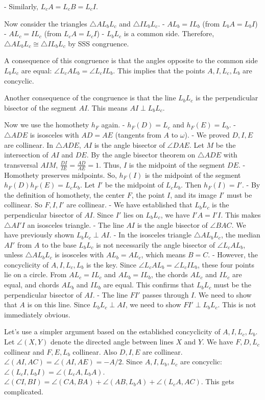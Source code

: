 - Similarly, $L_cA = L_cB = L_cI$.

Now consider the triangles $\triangle AL_bL_c$ and $\triangle IL_bL_c$.
- $AL_b = IL_b$ (from $L_bA=L_bI$)
- $AL_c = IL_c$ (from $L_cA=L_cI$)
- $L_bL_c$ is a common side.
Therefore, $\triangle AL_bL_c \cong \triangle IL_bL_c$ by SSS congruence.

A consequence of this congruence is that the angles opposite to the common side $L_bL_c$ are equal: $\angle L_cAL_b = \angle L_cIL_b$.
This implies that the points $A, I, L_c, L_b$ are concyclic.

Another consequence of the congruence is that the line $L_bL_c$ is the perpendicular bisector of the segment $AI$. This means $AI \perp L_bL_c$.

Now we use the homothety $h_F$ again.
- $h_F(D) = L_c$ and $h_F(E) = L_b$.
- $\triangle ADE$ is isosceles with $AD=AE$ (tangents from $A$ to $\omega$).
- We proved $D,I,E$ are collinear. In $\triangle ADE$, $AI$ is the angle bisector of $\angle DAE$. Let $M$ be the intersection of $AI$ and $DE$. By the angle bisector theorem on $\triangle ADE$ with transversal $AIM$, $\frac{DI}{IE}=\frac{AD}{AE}=1$. Thus, $I$ is the midpoint of the segment $DE$.
- Homothety preserves midpoints. So, $h_F(I)$ is the midpoint of the segment $h_F(D)h_F(E) = L_cL_b$. Let $I'$ be the midpoint of $L_cL_b$. Then $h_F(I) = I'$.
- By the definition of homothety, the center $F$, the point $I$, and its image $I'$ must be collinear. So $F, I, I'$ are collinear.
- We have established that $L_bL_c$ is the perpendicular bisector of $AI$. Since $I'$ lies on $L_bL_c$, we have $I'A = I'I$. This makes $\triangle AI'I$ an isosceles triangle.
- The line $AI$ is the angle bisector of $\angle BAC$. We have previously shown $L_bL_c \perp AI$.
- In the isosceles triangle $\triangle AL_bL_c$, the median $AI'$ from $A$ to the base $L_bL_c$ is not necessarily the angle bisector of $\angle L_cAL_b$, unless $\triangle AL_bL_c$ is isosceles with $AL_b=AL_c$, which means $B=C$.
- However, the concyclicity of $A,I,L_c,L_b$ is the key. Since $\angle L_cAL_b = \angle L_cIL_b$, these four points lie on a circle. From $AL_c = IL_c$ and $AL_b = IL_b$, the chords $AL_c$ and $IL_c$ are equal, and chords $AL_b$ and $IL_b$ are equal. This confirms that $L_bL_c$ must be the perpendicular bisector of $AI$.
- The line $FI'$ passes through $I$. We need to show that $A$ is on this line. Since $L_bL_c \perp AI$, we need to show $FI' \perp L_bL_c$. This is not immediately obvious.

Let's use a simpler argument based on the established concyclicity of $A,I,L_c,L_b$.
Let $\angle(X,Y)$ denote the directed angle between lines $X$ and $Y$.
We have $F, D, L_c$ collinear and $F, E, L_b$ collinear. Also $D, I, E$ are collinear.
$\angle(AI, AC) = \angle(AI, AE) = -A/2$.
Since $A, I, L_b, L_c$ are concyclic: $\angle(L_cI, L_bI) = \angle(L_cA, L_bA)$.
$\angle(CI, BI) = \angle(CA, BA) + \angle(AB, L_bA) + \angle(L_cA, AC)$. This gets complicated.

